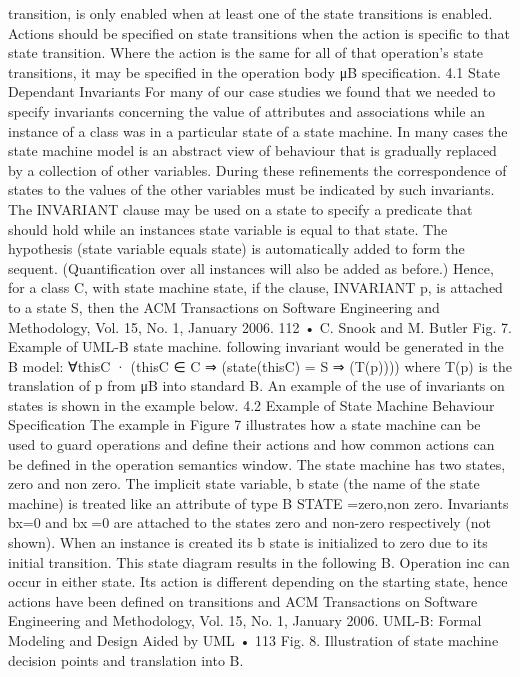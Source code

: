 transition, is only enabled when at least one of the state transitions is enabled.
Actions should be specified on state transitions when the action is specific to
that state transition. Where the action is the same for all of that operation’s
state transitions, it may be specified in the operation body μB specification.
4.1 State Dependant Invariants
For many of our case studies we found that we needed to specify invariants
concerning the value of attributes and associations while an instance of a class
was in a particular state of a state machine. In many cases the state machine
model is an abstract view of behaviour that is gradually replaced by a collection
of other variables. During these refinements the correspondence of states to the
values of the other variables must be indicated by such invariants. The INVARIANT
clause may be used on a state to specify a predicate that should hold while an
instances state variable is equal to that state. The hypothesis (state variable
equals state) is automatically added to form the sequent. (Quantification over
all instances will also be added as before.) Hence, for a class C, with state
machine state, if the clause, INVARIANT p, is attached to a state S, then the
ACM Transactions on Software Engineering and Methodology, Vol. 15, No. 1, January 2006.
112 • C. Snook and M. Butler
Fig. 7. Example of UML-B state machine.
following invariant would be generated in the B model:
∀thisC · (thisC ∈ C ⇒ (state(thisC) = S ⇒ (T(p))))
where T(p) is the translation of p from μB into standard B.
An example of the use of invariants on states is shown in the example
below.
4.2 Example of State Machine Behaviour Specification
The example in Figure 7 illustrates how a state machine can be used to guard
operations and define their actions and how common actions can be defined in
the operation semantics window.
The state machine has two states, zero and non zero. The implicit state variable, b state (the name of the state machine) is treated like an attribute of
type B STATE ={zero,non zero}. Invariants bx=0 and bx=0 are attached to the
states zero and non-zero respectively (not shown). When an instance is created
its b state is initialized to zero due to its initial transition. This state diagram
results in the following B.
Operation inc can occur in either state. Its action is different depending
on the starting state, hence actions have been defined on transitions and
ACM Transactions on Software Engineering and Methodology, Vol. 15, No. 1, January 2006.
UML-B: Formal Modeling and Design Aided by UML • 113
Fig. 8. Illustration of state machine decision points and translation into B.
